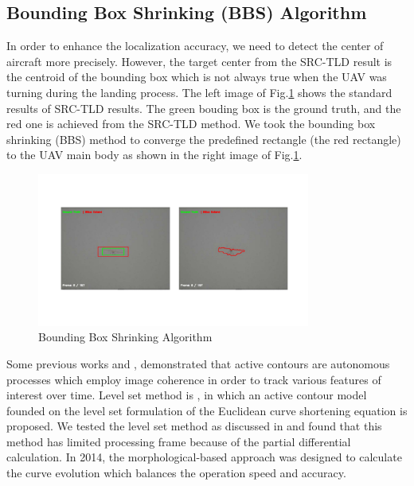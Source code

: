 \subsection{Bounding Box Shrinking (BBS) Algorithm}
In order to enhance the localization accuracy, we need to detect the center of aircraft more precisely. However, the target center from the SRC-TLD result is the centroid of the bounding box which is not always true when the UAV was turning during the landing process. The left image of Fig.\ref{fig:chp04_07_active_contour_demo} shows the standard results of SRC-TLD results. The green bouding box is the ground truth, and the red one is achieved from the SRC-TLD method. We took the bounding box shrinking (BBS) method to converge the predefined rectangle (the red rectangle) to the UAV main body as shown in the right image of Fig.\ref{fig:chp04_07_active_contour_demo}.

\begin{figure}[!th]
	\centering
	\includegraphics[width=0.8\textwidth]{Figs/chp04_07_active_contour_demo.pdf}
	\caption{Bounding Box Shrinking Algorithm}
	\label{fig:chp04_07_active_contour_demo}    
\end{figure}

Some previous works \cite{betser2004automatic} and \cite{sattigeri2007vision}, demonstrated that active contours are autonomous processes which employ image coherence in order to track various features of interest over time. Level set method is \cite{368173}, \cite{Caselles1993} in which an active contour model founded on the level set formulation of the Euclidean curve shortening equation is proposed. We tested the level set method as discussed in \cite{kong2013autonomous} and found that this method has limited processing frame because of the partial differential calculation. In 2014, the morphological-based approach was designed to calculate the curve evolution \cite{Marquez-Neila2014} which balances the operation speed and accuracy. 

